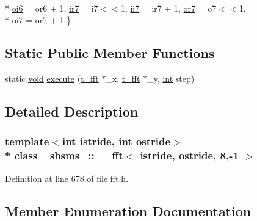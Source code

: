 \begin{DoxyCompactItemize}
\\*
\hyperlink{class__sbsms___1_1____fft_3_01istride_00_01ostride_00_018_00-1_01_4_a30386b5a7eb91689656b320c499d0b04a230646225f56af1fa6f7bbc36628c7e7}{oi6} = or6 + 1, 
\hyperlink{class__sbsms___1_1____fft_3_01istride_00_01ostride_00_018_00-1_01_4_a30386b5a7eb91689656b320c499d0b04aeb1719296a1aa67c2a47508cedea8523}{ir7} = i7$<$$<$1, 
\hyperlink{class__sbsms___1_1____fft_3_01istride_00_01ostride_00_018_00-1_01_4_a30386b5a7eb91689656b320c499d0b04aa503c1fc8560da243dc63a48cdc92388}{ii7} = ir7 + 1, 
\hyperlink{class__sbsms___1_1____fft_3_01istride_00_01ostride_00_018_00-1_01_4_a30386b5a7eb91689656b320c499d0b04ab27c1844d2edb2a63772bafeaa649a7c}{or7} = o7$<$$<$1, 
\\*
\hyperlink{class__sbsms___1_1____fft_3_01istride_00_01ostride_00_018_00-1_01_4_a30386b5a7eb91689656b320c499d0b04ad94400018032d55229befa3cf8fb8bcc}{oi7} = or7 + 1
 \}
\end{DoxyCompactItemize}
\subsection*{Static Public Member Functions}
\begin{DoxyCompactItemize}
\item 
static \hyperlink{sound_8c_ae35f5844602719cf66324f4de2a658b3}{void} \hyperlink{class__sbsms___1_1____fft_3_01istride_00_01ostride_00_018_00-1_01_4_a40d4b9b5ae985f4a5857566a971ba8d9}{execute} (\hyperlink{namespace__sbsms___af5c6f976b2da21c36853e3b0c5995a54}{t\+\_\+fft} $\ast$\+\_\+x, \hyperlink{namespace__sbsms___af5c6f976b2da21c36853e3b0c5995a54}{t\+\_\+fft} $\ast$\+\_\+y, \hyperlink{xmltok_8h_a5a0d4a5641ce434f1d23533f2b2e6653}{int} step)
\end{DoxyCompactItemize}


\subsection{Detailed Description}
\subsubsection*{template$<$int istride, int ostride$>$\\*
class \+\_\+sbsms\+\_\+\+::\+\_\+\+\_\+fft$<$ istride, ostride, 8,-\/1 $>$}



Definition at line 678 of file fft.\+h.



\subsection{Member Enumeration Documentation}
